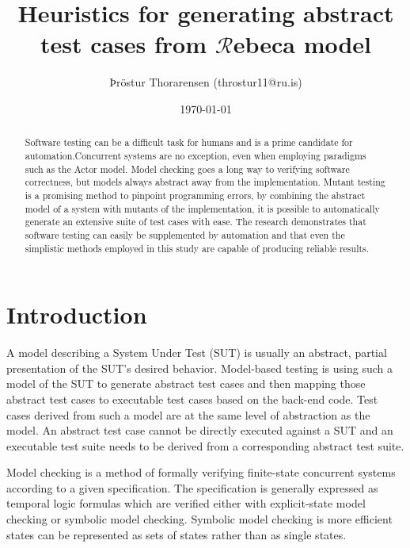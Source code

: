 \documentclass{article}
\begin{document}
\newcommand{\Rebeca}{$\mathcal{R}$ebeca\xspace}

\title{Heuristics for generating abstract test cases from \Rebeca model}
\author{Þröstur Thorarensen (throstur11@ru.is)}
\date{\today}
\maketitle

\begin{abstract}
	Software testing can be a difficult task for humans and is a prime candidate for automation.Concurrent systems are no exception, even when employing paradigms such as the Actor model. Model checking goes a long way to verifying software correctness, but models always abstract away from the implementation. Mutant testing is a promising method to pinpoint programming errors, by combining the abstract model of a system with mutants of the implementation, it is possible to automatically generate an extensive suite of test cases with ease. The research demonstrates that software testing can easily be supplemented by automation and that even the simplistic methods employed in this study are capable of producing reliable results.
\end{abstract}

\newpage
\tableofcontents
\newpage

	\section{Introduction}
		A model describing a System Under Test (SUT) is usually an abstract, partial presentation of the SUT's desired behavior. Model-based testing is using such a model of the SUT to generate abstract test cases and then mapping those abstract test cases to executable test cases based on the back-end code. Test cases derived from such a model are at the same level of abstraction as the model. An abstract test case cannot be directly executed against a SUT and an executable test suite needs to be derived from a corresponding abstract test suite.

		Model checking is a method of formally verifying finite-state concurrent systems according to a given specification. The specification is generally expressed as temporal logic formulas which are verified either with explicit-state model checking or symbolic model checking. Symbolic model checking is more efficient states can be represented as sets of states rather than as single states.
\end{document}
